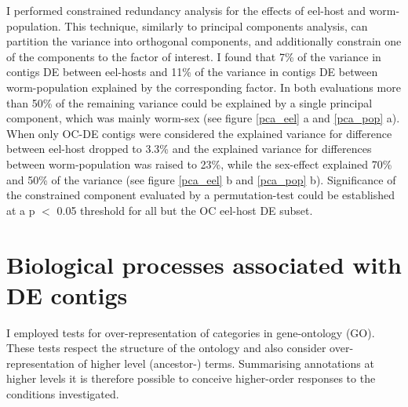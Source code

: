 I performed constrained redundancy analysis for the effects of
eel-host and worm-population. This technique, similarly to principal
components analysis, can partition the variance into orthogonal
components, and additionally constrain one of the components to the
factor of interest. I found that 7\% of the variance in contigs DE
between eel-hosts and 11\% of the variance in contigs DE between
worm-population explained by the corresponding factor. In both
evaluations more than 50\% of the remaining variance could be
explained by a single principal component, which was mainly worm-sex
(see figure \ref{pca_eel} a and \ref{pca_pop} a). When only OC-DE
contigs were considered the explained variance for difference between
eel-host dropped to 3.3\% and the explained variance for differences
between worm-population was raised to 23\%, while the sex-effect
explained 70\% and 50\% of the variance (see figure \ref{pca_eel} b
and \ref{pca_pop} b). Significance of the constrained component
evaluated by a permutation-test could be established at a p $<$ 0.05
threshold for all but the OC eel-host DE subset.



\afterpage{\clearpage}

\section{Biological processes associated with DE contigs}

I employed tests for over-representation of categories in
gene-ontology (GO). These tests respect the structure of the ontology
and also consider over-representation of higher level (ancestor-)
terms. Summarising annotations at higher levels it is therefore
possible to conceive higher-order responses to the conditions
investigated.

